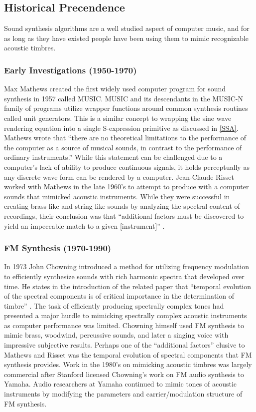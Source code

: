 \documentclass[12pt]{article}
\begin{document}
\subsection{Historical Precendence}\label{TMHISTORY}
Sound synthesis algorithms are a well studied aspect of computer music, and for as long as they have existed people have been using them to mimic recognizable acoustic timbres.

\subsubsection{Early Investigations (1950-1970)}
Max Mathews created the first widely used computer program for sound synthesis in 1957 called MUSIC. MUSIC and its descendants in the MUSIC-N family of programs utilize wrapper functions around common synthesis routines called unit generators. This is a similar concept to wrapping the sine wave rendering equation into a single S-expression primitive as discussed in \ref{SSA}. Mathews wrote that ``there are no theoretical limitations to the performance of the computer as a source of musical sounds, in contrast to the performance of ordinary instruments.'' \citep{mathews01111963} While this statement can be challenged due to a computer's lack of ability to produce continuous signals, it holds perceptually as any discrete wave form can be rendered by a computer. Jean-Claude Risset worked with Mathews in the late 1960's to attempt to produce with a computer sounds that mimicked acoustic instruments. While they were successful in creating brass-like and string-like sounds by analyzing the spectral content of recordings, their conclusion was that ``additional factors must be discovered to yield an impeccable match to a given [instrument]'' \citep{risset1969analysis}.

\subsubsection{FM Synthesis (1970-1990)}
In 1973 John Chowning introduced a method for utilizing frequency modulation to efficiently synthesize sounds with rich harmonic spectra that developed over time. He states in the introduction of the related paper that ``temporal evolution of the spectral components is of critical importance in the determination of timbre'' \citep{chowning1973synthesis}. The task of efficiently producing spectrally complex tones had presented a major hurdle to mimicking spectrally complex acoustic instruments as computer performance was limited. Chowning himself used FM synthesis to mimic brass, woodwind, percussive sounds, and later a singing voice \citep{chowning1989frequency} with impressive subjective results. Perhaps one of the ``additional factors'' elusive to Mathews and Risset was the temporal evolution of spectral components that FM synthesis provides.
Work in the 1980's on mimicking acoustic timbres was largely commercial after Stanford licensed Chowning's work on FM audio synthesis to Yamaha. Audio researchers at Yamaha continued to mimic tones of acoustic instruments by modifying the parameters and carrier/modulation structure of FM synthesis.
\end{document}
